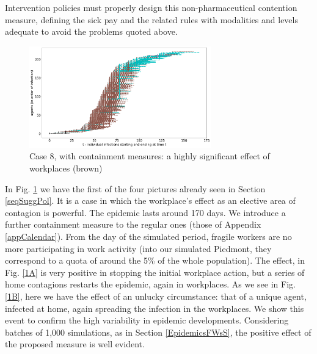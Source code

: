 \documentclass[graybox]{svmult}
\begin{document}
Intervention policies must properly design this non-pharmaceutical contention measure, defining the sick pay and the related rules with modalities and levels adequate to avoid the problems quoted above.

\begin{figure}[t]
\begin{center}
\includegraphics[width=0.7\textwidth]{withShort1.png}%
\caption{Case 8, with containment measures: a highly significant effect of workplaces (brown)}
\label{1}
\end{center}
\end{figure}


In Fig. \ref{1} we have the first of the four pictures already seen in Section \ref{seqSuggPol}. It is a case in which the workplace's effect as an elective area of contagion is powerful. The epidemic lasts around 170 days. We introduce a further containment measure to the regular ones (those of Appendix \ref{appCalendar}). From the  day of the simulated period, fragile workers are no more participating in work activity (into our simulated Piedmont, they correspond to a quota of around the 5\% of the whole population). The effect, in Fig. \ref{1A} is very positive in stopping the initial workplace action, but a series of home contagions restarts the epidemic, again in workplaces. As we see in Fig. \ref{1B}, here we have the effect of an unlucky circumstance: that of a unique agent, infected at home, again spreading the infection in the workplaces. We show this event to confirm the high variability in epidemic developments. Considering batches of 1,000 simulations, as in Section \ref{EpidemicsFWsS}, the positive effect of the proposed measure is well evident.
\end{document}
